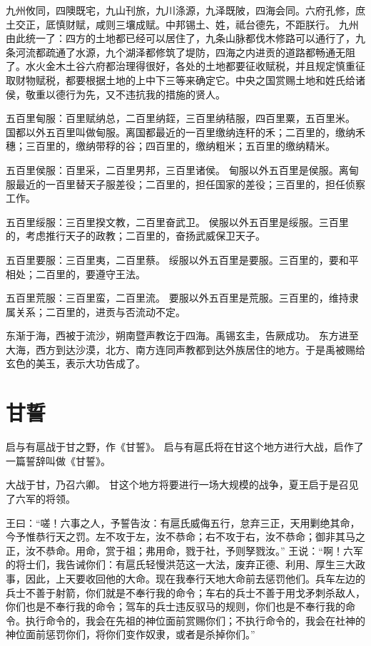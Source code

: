 \documentclass[a4paper,12pt,UTF8,twoside]{ctexbook}
\begin{document}
九州攸同，四隩既宅，九山刊旅，九川涤源，九泽既陂，四海会同。六府孔修，庶土交正，厎慎财赋，咸则三壤成赋。中邦锡土、姓，祗台德先，不距朕行。
九州由此统一了：四方的土地都已经可以居住了，九条山脉都伐木修路可以通行了，九条河流都疏通了水源，九个湖泽都修筑了堤防，四海之内进贡的道路都畅通无阻了。水火金木土谷六府都治理得很好，各处的土地都要征收赋税，并且规定慎重征取财物赋税，都要根据土地的上中下三等来确定它。中央之国赏赐土地和姓氏给诸侯，敬重以德行为先，又不违抗我的措施的贤人。

五百里甸服：百里赋纳总，二百里纳銍，三百里纳秸服，四百里粟，五百里米。
国都以外五百里叫做甸服。离国都最近的一百里缴纳连秆的禾；二百里的，缴纳禾穗；三百里的，缴纳带稃的谷；四百里的，缴纳粗米；五百里的缴纳精米。

五百里侯服：百里采，二百里男邦，三百里诸侯。
甸服以外五百里是侯服。离甸服最近的一百里替天子服差役；二百里的，担任国家的差役；三百里的，担任侦察工作。

五百里绥服：三百里揆文教，二百里奋武卫。
侯服以外五百里是绥服。三百里的，考虑推行天子的政教；二百里的，奋扬武威保卫天子。

五百里要服：三百里夷，二百里蔡。
绥服以外五百里是要服。三百里的，要和平相处；二百里的，要遵守王法。

五百里荒服：三百里蛮，二百里流。
要服以外五百里是荒服。三百里的，维持隶属关系；二百里的，进贡与否流动不定。

东渐于海，西被于流沙，朔南暨声教讫于四海。禹锡玄圭，告厥成功。
东方进至大海，西方到达沙漠，北方、南方连同声教都到达外族居住的地方。于是禹被赐给玄色的美玉，表示大功告成了。

\chapter{甘誓}

启与有扈战于甘之野，作《甘誓》。
启与有扈氏将在甘这个地方进行大战，启作了一篇誓辞叫做《甘誓》。

大战于甘，乃召六卿。
甘这个地方将要进行一场大规模的战争，夏王启于是召见了六军的将领。

王曰：“嗟！六事之人，予誓告汝：有扈氏威侮五行，怠弃三正，天用剿绝其命，今予惟恭行天之罚。左不攻于左，汝不恭命；右不攻于右，汝不恭命；御非其马之正，汝不恭命。用命，赏于祖；弗用命，戮于社，予则孥戮汝。”
王说：“啊！六军的将士们，我告诫你们：有扈氏轻慢洪范这一大法，废弃正德、利用、厚生三大政事，因此，上天要收回他的大命。现在我奉行天地大命前去惩罚他们。兵车左边的兵士不善于射箭，你们就是不奉行我的命令；车右的兵士不善于用戈矛刺杀敌人，你们也是不奉行我的命令；驾车的兵士违反驭马的规则，你们也是不奉行我的命令。执行命令的，我会在先祖的神位面前赏赐你们；不执行命令的，我会在社神的神位面前惩罚你们，将你们变作奴隶，或者是杀掉你们。”
\end{document}
